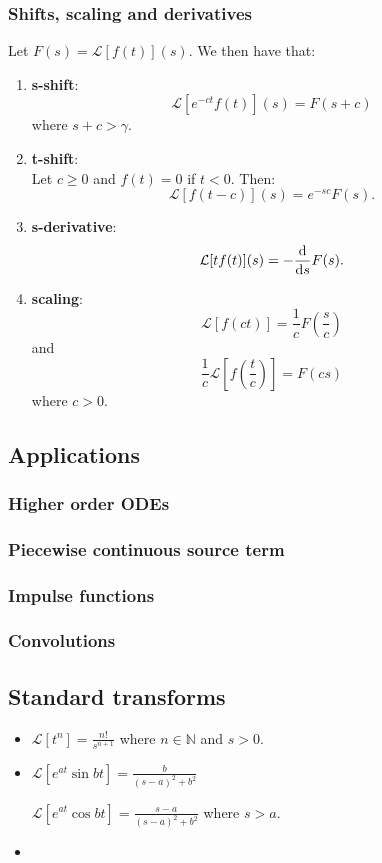 \documentclass{article}
\begin{document}
\subsubsection{Shifts, scaling and derivatives}
Let $F(s)=\mathcal{L}[f(t)](s)$.
We then have that:
\begin{enumerate}
    \item \textbf{s-shift}:
    $$\mathcal{L}[e^{-ct}f(t)](s)=F(s+c)$$
    where $s+c>\gamma$.
    \item \textbf{t-shift}: \\
    Let $c\geq0$ and $f(t)=0$ if $t<0$. Then:
    $$\mathcal{L}[f(t-c)](s)=e^{-sc}F(s).$$
    \item \textbf{s-derivative}:
    $$\mathcal{L}[tf(t)](s)=-\dv{s}F(s).$$

    \newpage

    \item \textbf{scaling}:
    $$\mathcal{L}[f(ct)]=\frac{1}{c}F(\frac{s}{c})$$
    and
    $$\frac{1}{c}\mathcal{L}[f(\frac{t}{c})]=F(cs)$$
    where $c>0$.
\end{enumerate}

\subsection{Applications}

\subsubsection{Higher order ODEs}

\subsubsection{Piecewise continuous source term}

\subsubsection{Impulse functions}

\subsubsection{Convolutions}

\newpage

\subsection{Standard transforms}
\begin{itemize}
    \item $\displaystyle\mathcal{L}[t^n]
    =\frac{n!}{s^{n+1}}$
    where $n\in\mathbb{N}$ and $s>0$.
    \item $\displaystyle\mathcal{L}
    [e^{at}\sin bt]=\frac{b}{(s-a)^2+b^2}$

    $\displaystyle\mathcal{L}
    [e^{at}\cos bt]=\frac{s-a}{(s-a)^2+b^2}$
    where $s>a$.
    \item 
\end{itemize}
\end{document}
